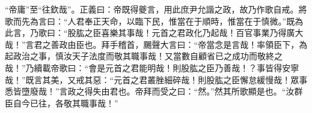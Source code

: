 {\noindent\shu{}\fzkt “帝庸”至“往欽哉”。正義曰：帝既得夔言，用此庶尹允諧之政，故乃作歌自戒。將歌而先為言曰：“人君奉正天命，以臨下民，惟當在于順時，惟當在于慎微。”既為此言，乃歌曰：“股肱之臣喜樂其事哉！元首之君政化乃起哉！百官事業乃得廣大哉！”言君之善政由臣也。拜手稽首，颺聲大言曰：“帝當念是言哉！率領臣下，為起政治之事，慎汝天子法度而敬其職事哉！又當數自顧省已之成功而敬終之哉！”乃續載帝歌曰：“會是元首之君能明哉！則股肱之臣乃善哉！？事皆得安寧哉！”既言其美，又戒其惡：“元首之君叢脞細碎哉！則股肱之臣懈怠緩慢哉！眾事悉皆墮廢哉！”言政之得失由君也。帝拜而受之曰：“然。”然其所歌顯是也。“汝群臣自今已往，各敬其職事哉！” \par}

